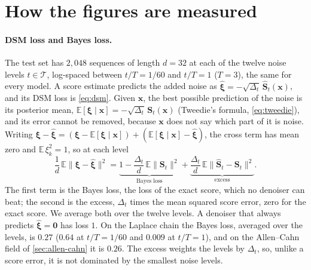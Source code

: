 \documentclass{article}
\begin{document}



\newpage
\appendix
\onecolumn
\let\appendixsection\section
\renewcommand{\section}{\FloatBarrier\appendixsection}
\section{How the figures are measured}
\label{app:measures}

\paragraph{DSM loss and Bayes loss.} The test set has $2{,}048$ sequences of length $d=32$ at each of the twelve noise
levels $t\in\mathcal T$, log-spaced between $t/T=1/60$ and $t/T=1$ ($T=3$), the same for every model. A score estimate predicts the added
noise as $\widehat{\boldsymbol\xi}=-\sqrt{\Delta_t}\,\widehat{\mathbf S}_t(\mathbf x)$, and its DSM loss is
\cref{eq:dsm}. Given $\mathbf x$, the best possible prediction of the noise is its posterior mean,
$\mathbb E[\boldsymbol\xi\mid\mathbf x]=-\sqrt{\Delta_t}\,\mathbf S_t(\mathbf x)$ (Tweedie's formula, \cref{eq:tweedie}),
and its error cannot be removed, because $\mathbf x$ does not say which part of it is noise. Writing
$\boldsymbol\xi-\widehat{\boldsymbol\xi}=(\boldsymbol\xi-\mathbb E[\boldsymbol\xi\mid\mathbf x])
+(\mathbb E[\boldsymbol\xi\mid\mathbf x]-\widehat{\boldsymbol\xi})$, the cross term has mean zero and $\mathbb E\,\xi_k^2=1$,
so at each level
\begin{equation}
  \frac1d\,\mathbb E\|\boldsymbol\xi-\widehat{\boldsymbol\xi}\|^2
  =\underbrace{1-\frac{\Delta_t}{d}\,\mathbb E\|\mathbf S_t\|^2}_{\text{Bayes loss}}
  +\underbrace{\frac{\Delta_t}{d}\,\mathbb E\|\widehat{\mathbf S}_t-\mathbf S_t\|^2}_{\text{excess}} .
  \label{eq:dsm-decomposition}
\end{equation}
The first term is the Bayes loss, the loss of the exact score, which no denoiser can beat; the second is the excess,
$\Delta_t$ times the mean squared score error, zero for the exact score. We average both over the twelve levels. A
denoiser that always predicts $\widehat{\boldsymbol\xi}=\mathbf 0$ has loss $1$. On the Laplace chain the Bayes loss,
averaged over the levels, is $0.27$ ($0.64$ at $t/T=1/60$ and $0.009$ at $t/T=1$), and on the Allen--Cahn field of
\cref{sec:allen-cahn} it is $0.26$. The excess weights the levels by $\Delta_t$, so, unlike a score error, it is not
dominated by the smallest noise levels.
\end{document}
